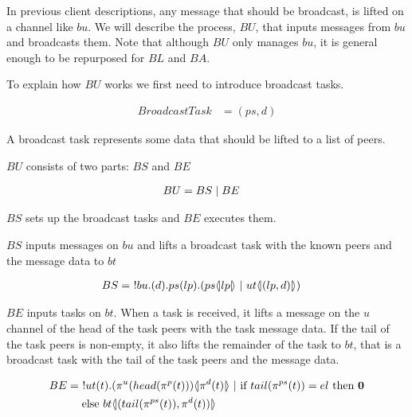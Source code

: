 In previous client descriptions, any message that should be broadcast, is lifted on a channel like $bu$.
We will describe the process, $BU$, that inputs messages from $bu$ and broadcasts them.
Note that although $BU$ only manages $bu$, it is general enough to be repurposed for $BL$ and $BA$.

To explain how $BU$ works we first need to introduce broadcast tasks.

\begin{align*}
    BroadcastTask &= (ps, d)
\end{align*}

A broadcast task represents some data that should be lifted to a list of peers.

$BU$ consists of two parts: $BS$ and $BE$

\begin{align*}
    BU &= BS \mid BE
\end{align*}

$BS$ sets up the broadcast tasks and $BE$ executes them.

$BS$ inputs messages on $bu$ and lifts a broadcast task with the known peers and the message data to $bt$

\begin{align*}
    BS &=\ !bu.(d).ps(lp).(ps \langle \! | lp | \! \rangle\ |\ ut \langle \! | (lp,d) | \! \rangle)
\end{align*}

$BE$ inputs tasks on $bt$.
When a task is received, it lifts a message on the $u$ channel of the head of the task peers with the task message data.
If the tail of the task peers is non-empty, it also lifts the remainder of the task to $bt$, that is a broadcast task with the tail of the task peers and the message data.

\begin{align*}
    BE &=\ !ut(t).(\pi^{u}(head(\pi^{p}(t)))\lift{}{\pi^{d}(t)}\ |\If{tail(\pi^{ps}(t))=el}{\nil\\
    &\quad}{bt\lift{}{(tail(\pi^{ps}(t)),\pi^{d}(t))}}
\end{align*}
